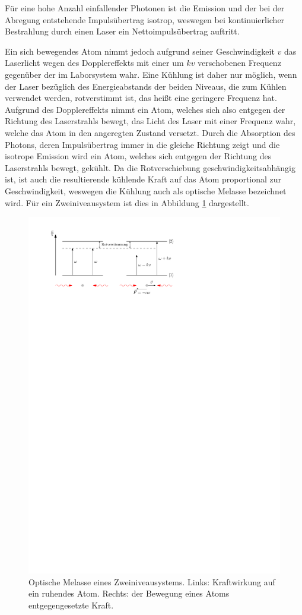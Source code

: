 \documentclass[11pt, a4paper]{article}
\numberwithin{equation}{section}
\begin{document}
Für eine hohe Anzahl einfallender Photonen ist die Emission und der bei der Abregung entstehende Impulsübertrag isotrop, weswegen bei kontinuierlicher Bestrahlung durch einen Laser ein Nettoimpulsübertrag auftritt.

Ein sich bewegendes Atom nimmt jedoch aufgrund seiner Geschwindigkeit $v$ das Laserlicht wegen des Dopplereffekts mit einer um $kv$ verschobenen Frequenz gegenüber der im Laborsystem wahr.
Eine Kühlung ist daher nur möglich, wenn der Laser bezüglich des Energieabstands der beiden Niveaus, die zum Kühlen verwendet werden, rotverstimmt ist, das heißt eine geringere Frequenz hat.
Aufgrund des Dopplereffekts nimmt ein Atom, welches sich also entgegen der Richtung des Laserstrahls bewegt, das Licht des Laser mit einer Frequenz wahr, welche das Atom in den angeregten Zustand versetzt.
Durch die Absorption des Photons, deren Impulsübertrag immer in die gleiche Richtung zeigt und die isotrope Emission wird ein Atom, welches sich entgegen der Richtung des Laserstrahls bewegt, gekühlt.
Da die Rotverschiebung geschwindigkeitsabhängig ist, ist auch die resultierende kühlende Kraft auf das Atom proportional zur Geschwindigkeit, weswegen die Kühlung auch als optische Melasse bezeichnet wird.
Für ein Zweiniveausystem ist dies in Abbildung \ref{fig:opt_melasse} dargestellt.
\begin{figure}[h]
	\centering
	\includegraphics[width=.8\textwidth]{./figures/theory/melasse}
	\caption{Optische Melasse eines Zweiniveausystems. Links: Kraftwirkung auf ein ruhendes Atom. Rechts: der Bewegung eines Atoms entgegengesetzte Kraft.}
	\label{fig:opt_melasse}
\end{figure}
\end{document}
